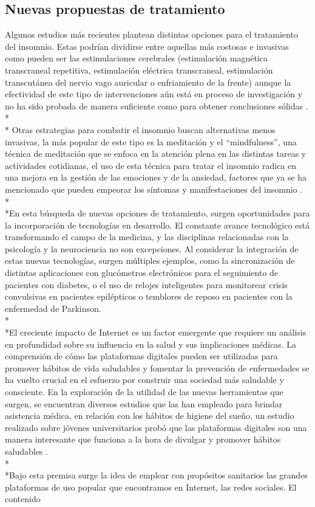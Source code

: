 \documentclass[a4paper,12pt,twoside]{memoir}
\begin{document}
\begin{itemize}
    \subsection{Nuevas propuestas de tratamiento}
    \text Algunos estudios más recientes plantean distintas opciones para el tratamiento del insomnio. Estas podrían dividirse entre aquellas más costosas e invasivas como pueden ser las estimulaciones cerebrales (estimulación magnética transcraneal repetitiva, estimulación eléctrica transcraneal, estimulación transcutánea del nervio vago auricular o enfriamiento de la frente) aunque la efectividad de este tipo de intervenciones aún está en proceso de investigación y no ha sido probada de manera suficiente como para obtener conclusiones sólidas \cite{krone2023}.\\*\\* Otras estrategias para combatir el insomnio buscan alternativas menos invasivas, la más popular de este tipo es la meditación y el “mindfulness”, una técnica de meditación que se enfoca en la atención plena en las distintas tareas y actividades cotidianas, el uso de esta técnica para tratar el insomnio radica en una mejora en la gestión de las emociones y de la ansiedad, factores que ya se ha mencionado que pueden empeorar los síntomas y manifestaciones del insomnio \cite{rusch2018}.\\*\\*En esta búsqueda de nuevas opciones de tratamiento, surgen oportunidades para la incorporación de tecnologías en desarrollo. El constante avance tecnológico está transformando el campo de la medicina, y las disciplinas relacionadas con la psicología y la neurociencia no son excepciones. Al considerar la integración de estas nuevas tecnologías, surgen múltiples ejemplos, como la sincronización de distintas aplicaciones con glucómetros electrónicos para el seguimiento de pacientes con diabetes, o el uso de relojes inteligentes para monitorear crisis convulsivas en pacientes epilépticos o temblores de reposo en pacientes con la enfermedad de Parkinson\cite{reeder2016}.\\*\\*El creciente impacto de Internet es un factor emergente que requiere un análisis en profundidad sobre su influencia en la salud y sus implicaciones médicas. La comprensión de cómo las plataformas digitales pueden ser utilizadas para promover hábitos de vida saludables y fomentar la prevención de enfermedades se ha vuelto crucial en el esfuerzo por construir una sociedad más saludable y consciente. En la exploración de la utilidad de las nuevas herramientas que surgen, se encuentran diversos estudios que las han empleado para brindar asistencia médica, en relación con los hábitos de higiene del sueño, un estudio realizado sobre jóvenes universitarios probó que las plataformas digitales son una manera interesante que funciona a la hora de divulgar y promover hábitos saludables \cite{murawski2018}.\\*\\*Bajo esta premisa surge la idea de emplear con propósitos sanitarios las grandes plataformas de uso popular que encontramos en Internet, las redes sociales. El contenido 
\end{itemize}
\end{document}
